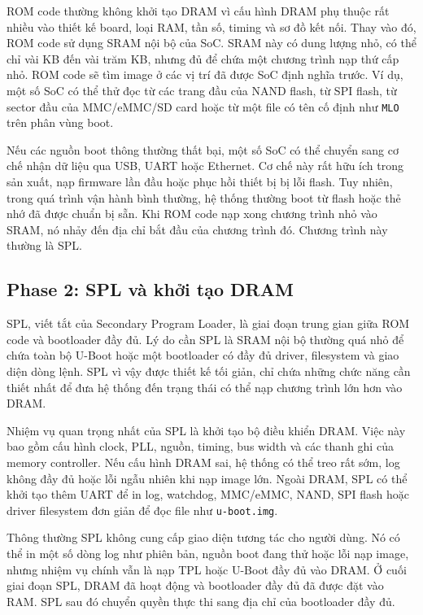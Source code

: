 \documentclass[11pt]{article}
\newcommand{\code}[1]{\texttt{#1}}
\begin{document}
ROM code thường không khởi tạo DRAM vì cấu hình DRAM phụ thuộc rất nhiều vào thiết kế board, loại RAM, tần số, timing và sơ đồ kết nối. Thay vào đó, ROM code sử dụng SRAM nội bộ của SoC. SRAM này có dung lượng nhỏ, có thể chỉ vài KB đến vài trăm KB, nhưng đủ để chứa một chương trình nạp thứ cấp nhỏ. ROM code sẽ tìm image ở các vị trí đã được SoC định nghĩa trước. Ví dụ, một số SoC có thể thử đọc từ các trang đầu của NAND flash, từ SPI flash, từ sector đầu của MMC/eMMC/SD card hoặc từ một file có tên cố định như \code{MLO} trên phân vùng boot.

Nếu các nguồn boot thông thường thất bại, một số SoC có thể chuyển sang cơ chế nhận dữ liệu qua USB, UART hoặc Ethernet. Cơ chế này rất hữu ích trong sản xuất, nạp firmware lần đầu hoặc phục hồi thiết bị bị lỗi flash. Tuy nhiên, trong quá trình vận hành bình thường, hệ thống thường boot từ flash hoặc thẻ nhớ đã được chuẩn bị sẵn. Khi ROM code nạp xong chương trình nhỏ vào SRAM, nó nhảy đến địa chỉ bắt đầu của chương trình đó. Chương trình này thường là SPL.

\subsection{Phase 2: SPL và khởi tạo DRAM}

SPL, viết tắt của Secondary Program Loader, là giai đoạn trung gian giữa ROM code và bootloader đầy đủ. Lý do cần SPL là SRAM nội bộ thường quá nhỏ để chứa toàn bộ U-Boot hoặc một bootloader có đầy đủ driver, filesystem và giao diện dòng lệnh. SPL vì vậy được thiết kế tối giản, chỉ chứa những chức năng cần thiết nhất để đưa hệ thống đến trạng thái có thể nạp chương trình lớn hơn vào DRAM.

Nhiệm vụ quan trọng nhất của SPL là khởi tạo bộ điều khiển DRAM. Việc này bao gồm cấu hình clock, PLL, nguồn, timing, bus width và các thanh ghi của memory controller. Nếu cấu hình DRAM sai, hệ thống có thể treo rất sớm, log không đầy đủ hoặc lỗi ngẫu nhiên khi nạp image lớn. Ngoài DRAM, SPL có thể khởi tạo thêm UART để in log, watchdog, MMC/eMMC, NAND, SPI flash hoặc driver filesystem đơn giản để đọc file như \code{u-boot.img}.

Thông thường SPL không cung cấp giao diện tương tác cho người dùng. Nó có thể in một số dòng log như phiên bản, nguồn boot đang thử hoặc lỗi nạp image, nhưng nhiệm vụ chính vẫn là nạp TPL hoặc U-Boot đầy đủ vào DRAM. Ở cuối giai đoạn SPL, DRAM đã hoạt động và bootloader đầy đủ đã được đặt vào RAM. SPL sau đó chuyển quyền thực thi sang địa chỉ của bootloader đầy đủ.
\end{document}
